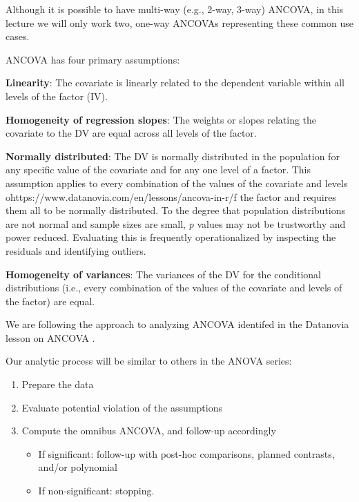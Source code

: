 \documentclass[
  11pt,
]{book}
\providecommand{\tightlist}{%
  \setlength{\itemsep}{0pt}\setlength{\parskip}{0pt}}
\begin{document}
Although it is possible to have multi-way (e.g., 2-way, 3-way) ANCOVA, in this lecture we will only work two, one-way ANCOVAs representing these common use cases.

ANCOVA has four primary assumptions:

\textbf{Linearity}: The covariate is linearly related to the dependent variable within all levels of the factor (IV).

\textbf{Homogeneity of regression slopes}: The weights or slopes relating the covariate to the DV are equal across all levels of the factor.

\textbf{Normally distributed}: The DV is normally distributed in the population for any specific value of the covariate and for any one level of a factor. This assumption applies to every combination of the values of the covariate and levels ohttps://www.datanovia.com/en/lessons/ancova-in-r/f the factor and requires them all to be normally distributed. To the degree that population distributions are not normal and sample sizes are small, \emph{p} values may not be trustworthy and power reduced. Evaluating this is frequently operationalized by inspecting the residuals and identifying outliers.

\textbf{Homogeneity of variances}: The variances of the DV for the conditional distributions (i.e., every combination of the values of the covariate and levels of the factor) are equal.

We are following the approach to analyzing ANCOVA identifed in the Datanovia lesson on ANCOVA \citep{datanovia_ancova_nodate}.

Our analytic process will be similar to others in the ANOVA series:

\begin{enumerate}
\def\labelenumi{\arabic{enumi}.}
\tightlist
\item
  Prepare the data
\item
  Evaluate potential violation of the assumptions
\item
  Compute the omnibus ANCOVA, and follow-up accordingly

  \begin{itemize}
  \tightlist
  \item
    If significant: follow-up with post-hoc comparisons, planned contrasts, and/or polynomial
  \item
    If non-significant: stopping.
  \end{itemize}
\end{enumerate}
\end{document}
